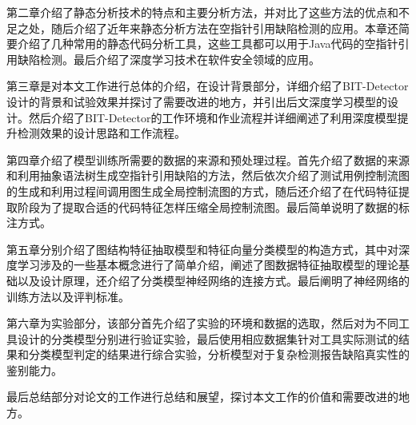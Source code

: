 第二章介绍了静态分析技术的特点和主要分析方法，并对比了这些方法的优点和不足之处，随后介绍了近年来静态分析方法在空指针引用缺陷检测的应用。本章还简要介绍了几种常用的静态代码分析工具，这些工具都可以用于Java代码的空指针引用缺陷检测。最后介绍了深度学习技术在软件安全领域的应用。

第三章是对本文工作进行总体的介绍，在设计背景部分，详细介绍了BIT-Detector设计的背景和试验效果并探讨了需要改进的地方，并引出后文深度学习模型的设计。然后介绍了BIT-Detector的工作环境和作业流程并详细阐述了利用深度模型提升检测效果的设计思路和工作流程。

第四章介绍了模型训练所需要的数据的来源和预处理过程。首先介绍了数据的来源和利用抽象语法树生成空指针引用缺陷的方法，然后依次介绍了测试用例控制流图的生成和利用过程间调用图生成全局控制流图的方式，随后还介绍了在代码特征提取阶段为了提取合适的代码特征怎样压缩全局控制流图。最后简单说明了数据的标注方式。

第五章分别介绍了图结构特征抽取模型和特征向量分类模型的构造方式，其中对深度学习涉及的一些基本概念进行了简单介绍，阐述了图数据特征抽取模型的理论基础以及设计原理，还介绍了分类模型神经网络的连接方式。最后阐明了神经网络的训练方法以及评判标准。 

第六章为实验部分，该部分首先介绍了实验的环境和数据的选取，然后对为不同工具设计的分类模型分别进行验证实验，最后使用相应数据集针对工具实际测试的结果和分类模型判定的结果进行综合实验，分析模型对于复杂检测报告缺陷真实性的鉴别能力。

最后总结部分对论文的工作进行总结和展望，探讨本文工作的价值和需要改进的地方。
